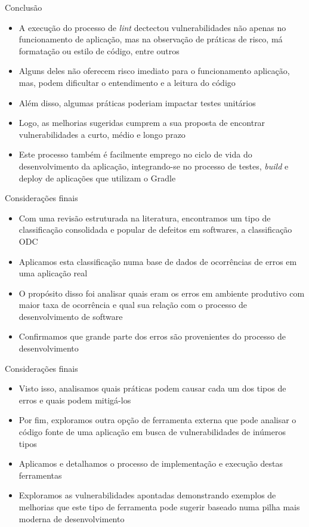 \documentclass[brazilian]{beamer}
\begin{document}
\begin{frame}{Conclusão}
    \begin{itemize}
        \item A execução do processo de \textit{lint} dectectou vulnerabilidades não apenas no funcionamento de aplicação, mas na observação de práticas de risco, má formatação ou estilo de código, entre outros
        \item Alguns deles não oferecem risco imediato para o funcionamento aplicação, mas, podem dificultar o entendimento e a leitura do código
        \item Além disso, algumas práticas poderiam impactar testes unitários
        \item Logo, as melhorias sugeridas cumprem a sua proposta de encontrar vulnerabilidades a curto, médio e longo prazo
        \item Este processo também é facilmente emprego no ciclo de vida do desenvolvimento da aplicação, integrando-se no processo de testes, \textit{build} e deploy de aplicações que utilizam o Gradle
    \end{itemize}
\end{frame}

\begin{frame}{Considerações finais}
    \begin{itemize}
        \item Com uma revisão estruturada na literatura, encontramos um tipo de classificação consolidada e popular de defeitos em softwares, a classificação ODC
        \item Aplicamos esta classificação numa base de dados de ocorrências de erros em uma aplicação real
        \item O propósito disso foi analisar quais eram os erros em ambiente produtivo com maior taxa de ocorrência e qual sua relação com o processo de desenvolvimento de software
        \item Confirmamos que grande parte dos erros são provenientes do processo de desenvolvimento
    \end{itemize}
\end{frame}

\begin{frame}{Considerações finais}
    \begin{itemize}
        \item Visto isso, analisamos quais práticas podem causar cada um dos tipos de erros e quais podem mitigá-los
        \item Por fim, exploramos outra opção de ferramenta externa que pode analisar o código fonte de uma aplicação em busca de vulnerabilidades de inúmeros tipos
        \item Aplicamos e detalhamos o processo de implementação e execução destas ferramentas
        \item Exploramos as vulnerabilidades apontadas demonstrando exemplos de melhorias que este tipo de ferramenta pode sugerir baseado numa pilha mais moderna de desenvolvimento
    \end{itemize}
\end{frame}
\end{document}
